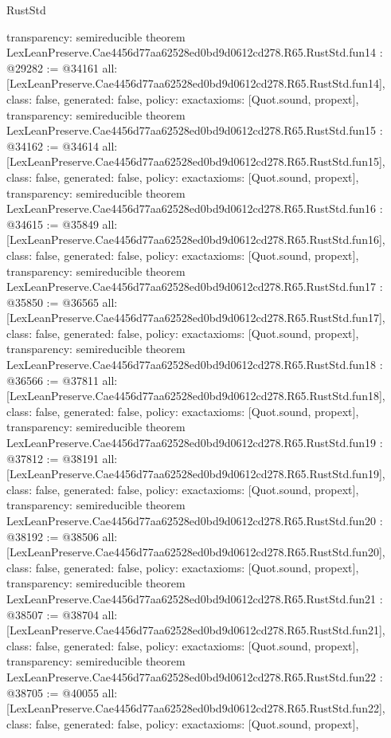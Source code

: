 \begin{lexlean}{RustStd}
\begin{coremodule}
{  transparency: semireducible
}
theorem LexLeanPreserve.Cae4456d77aa62528ed0bd9d0612cd278.R65.RustStd.fun14 : @29282 := @34161 {
  all: [LexLeanPreserve.Cae4456d77aa62528ed0bd9d0612cd278.R65.RustStd.fun14],
  class: false,
  generated: false,
  policy: exact{axioms: [Quot.sound, propext]},
  transparency: semireducible
}
theorem LexLeanPreserve.Cae4456d77aa62528ed0bd9d0612cd278.R65.RustStd.fun15 : @34162 := @34614 {
  all: [LexLeanPreserve.Cae4456d77aa62528ed0bd9d0612cd278.R65.RustStd.fun15],
  class: false,
  generated: false,
  policy: exact{axioms: [Quot.sound, propext]},
  transparency: semireducible
}
theorem LexLeanPreserve.Cae4456d77aa62528ed0bd9d0612cd278.R65.RustStd.fun16 : @34615 := @35849 {
  all: [LexLeanPreserve.Cae4456d77aa62528ed0bd9d0612cd278.R65.RustStd.fun16],
  class: false,
  generated: false,
  policy: exact{axioms: [Quot.sound, propext]},
  transparency: semireducible
}
theorem LexLeanPreserve.Cae4456d77aa62528ed0bd9d0612cd278.R65.RustStd.fun17 : @35850 := @36565 {
  all: [LexLeanPreserve.Cae4456d77aa62528ed0bd9d0612cd278.R65.RustStd.fun17],
  class: false,
  generated: false,
  policy: exact{axioms: [Quot.sound, propext]},
  transparency: semireducible
}
theorem LexLeanPreserve.Cae4456d77aa62528ed0bd9d0612cd278.R65.RustStd.fun18 : @36566 := @37811 {
  all: [LexLeanPreserve.Cae4456d77aa62528ed0bd9d0612cd278.R65.RustStd.fun18],
  class: false,
  generated: false,
  policy: exact{axioms: [Quot.sound, propext]},
  transparency: semireducible
}
theorem LexLeanPreserve.Cae4456d77aa62528ed0bd9d0612cd278.R65.RustStd.fun19 : @37812 := @38191 {
  all: [LexLeanPreserve.Cae4456d77aa62528ed0bd9d0612cd278.R65.RustStd.fun19],
  class: false,
  generated: false,
  policy: exact{axioms: [Quot.sound, propext]},
  transparency: semireducible
}
theorem LexLeanPreserve.Cae4456d77aa62528ed0bd9d0612cd278.R65.RustStd.fun20 : @38192 := @38506 {
  all: [LexLeanPreserve.Cae4456d77aa62528ed0bd9d0612cd278.R65.RustStd.fun20],
  class: false,
  generated: false,
  policy: exact{axioms: [Quot.sound, propext]},
  transparency: semireducible
}
theorem LexLeanPreserve.Cae4456d77aa62528ed0bd9d0612cd278.R65.RustStd.fun21 : @38507 := @38704 {
  all: [LexLeanPreserve.Cae4456d77aa62528ed0bd9d0612cd278.R65.RustStd.fun21],
  class: false,
  generated: false,
  policy: exact{axioms: [Quot.sound, propext]},
  transparency: semireducible
}
theorem LexLeanPreserve.Cae4456d77aa62528ed0bd9d0612cd278.R65.RustStd.fun22 : @38705 := @40055 {
  all: [LexLeanPreserve.Cae4456d77aa62528ed0bd9d0612cd278.R65.RustStd.fun22],
  class: false,
  generated: false,
  policy: exact{axioms: [Quot.sound, propext]},
}
\end{coremodule}
\end{lexlean}
